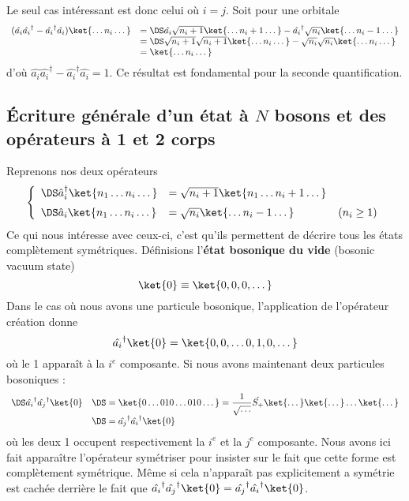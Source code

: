 Le seul cas intéressant est donc celui où $i=j$. Soit pour une orbitale
\begin{equation}
\begin{array}{ll}
(\hat{a_i}\hat{a_i}^\dagger -\hat{a_i}^\dagger\hat{a_i})\ket{\dots n_i\dots} &=\DS \hat{a_i}\sqrt{n_i+1}\ket{\dots n_i+1\dots}-
\hat{a_i}^\dagger\sqrt{n_i}\ket{\dots n_i-1\dots}\\
&=\DS \sqrt{n_i+1}\sqrt{n_i+1}\ket{\dots n_i\dots}-\sqrt{n_i}\sqrt{n_i}\ket{\dots n_i\dots}\\
&=\ket{\dots n_i\dots}
\end{array}
\end{equation}
d'où $\hat{a_i}\hat{a_i}^\dagger -\hat{a_i}^\dagger\hat{a_i} = \hat{1}$. Ce résultat est fondamental pour la seconde quantification.

\subsection{Écriture générale d'un état à $N$ bosons et des opérateurs à 1 et 2 corps}
Reprenons nos deux opérateurs
\begin{equation}
\left\{\begin{array}{ll}
\DS\hat{a}_i^\dagger \ket{n_1\dots n_i\dots} &= \sqrt{n_i+1}\ket{n_1\dots n_i+1\dots}\vspace{2mm}\\
\DS\hat{a}_i\ket{n_1\dots n_i\dots} &= \sqrt{n_i}\ket{\dots n_i-1\dots}\qquad\qquad (n_i\geq 1)
\end{array}\right.
\end{equation}
Ce qui nous intéresse avec ceux-ci, c'est qu'ils permettent de décrire tous les états complètement symétriques.
Définisions l'\textbf{état bosonique du vide} (bosonic vacuum state)
\begin{equation}
\ket{0} \equiv\ket{0,0,0,\dots}
\end{equation}
Dans le cas où nous avons une particule bosonique, l'application de l'opérateur création donne
\begin{equation}
\hat{a_i}^\dagger\ket{0} = \ket{0,0,\dots 0,1,0,\dots}
\end{equation}
où le 1 apparaît à la $i^e$ composante. Si nous avons maintenant deux particules bosoniques :
\begin{equation}
\begin{array}{ll}
\DS\hat{a_i}^\dagger\hat{a_j}^\dagger\ket{0} &\DS= \ket{0\dots 010\dots 010\dots} = \dfrac{1}{\sqrt{\dots}}\hat{S_+}
\ket{\dots}\ket{\dots}\dots\ket{\dots}\\
&\DS=\hat{a_j}^\dagger\hat{a_i}^\dagger\ket{0}
\end{array}
\end{equation}
où les deux 1 occupent respectivement la $i^e$ et la $j^e$ composante. Nous avons ici fait 
apparaître l'opérateur symétriser pour insister sur le fait que cette forme est complètement symétrique. 
Même si cela n'apparaît pas explicitement a symétrie est cachée derrière le fait que 
$\hat{a_i}^\dagger\hat{a_j}^\dagger\ket{0} = \hat{a_j}^\dagger\hat{a_i}^\dagger\ket{0}$.\\

